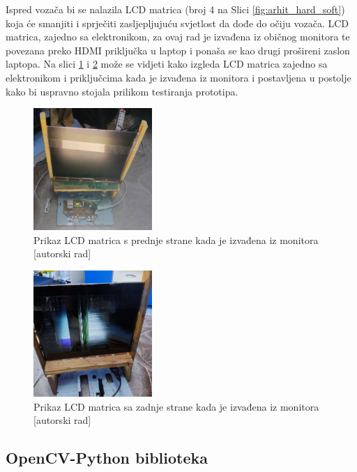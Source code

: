 \documentclass{foi}
\begin{document}
Ispred vozača bi se nalazila LCD matrica (broj 4 na Slici \ref{fig:arhit_hard_soft}) koja će smanjiti i sprječiti zasljepljujuću svjetlost da dođe do očiju vozača. LCD matrica, zajedno sa elektronikom, za ovaj rad je izvađena iz običnog monitora te povezana preko HDMI priključka u laptop i ponaša se kao drugi prošireni zaslon laptopa. Na slici \ref{fig:lcd_matrica_1} i \ref{fig:lcd_matrica_2} može se vidjeti kako izgleda LCD matrica zajedno sa elektronikom i priključcima kada je izvađena iz monitora i postavljena u postolje kako bi uspravno stojala prilikom testiranja prototipa.

\begin{figure}[h!]
    \centering
    \includegraphics[width=0.4\textwidth]{slike/lcd_matrica_1}
    \caption{Prikaz LCD matrica s prednje strane kada je izvađena iz monitora [autorski rad]}
    \label{fig:lcd_matrica_1}
\end{figure}

\begin{figure}[h!]
    \centering
    \includegraphics[width=0.4\textwidth]{slike/lcd_matrica_2}
    \caption{Prikaz LCD matrica sa zadnje strane kada je izvađena iz monitora [autorski rad]}
    \label{fig:lcd_matrica_2}
\end{figure}

\newpage
\subsection{OpenCV-Python biblioteka}
\end{document}
